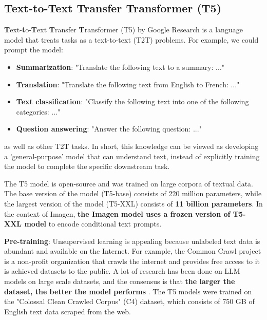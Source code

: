 \subsection{Text-to-Text Transfer Transformer (T5)}
\label{subsec:t5}

\textbf{T}ext-\textbf{t}o-\textbf{T}ext \textbf{T}ransfer \textbf{T}ransformer (T5) \cite{t5_model} by Google Research is a language model that treats tasks as a text-to-text (T2T) problems. For example, we could prompt the model:

\begin{itemize}
    \item \textbf{Summarization}: "Translate the following text to a summary: ..."
    \item \textbf{Translation}: "Translate the following text from English to French: ..."
    \item \textbf{Text classification}: "Classify the following text into one of the following categories: ..."
    \item \textbf{Question answering}: "Answer the following question: ..."
\end{itemize}

as well as other T2T tasks. In short, this knowledge can be viewed as developing a 'general-purpose' model that can understand text, instead of explicitly training the model to complete the specific downstream task.

The T5 model is open-source and was trained on large corpora of textual data. The base version of the model (T5-base) consists of 220 million parameters, while the largest version of the model (T5-XXL) consists of \textbf{11 billion parameters}. In the context of Imagen, \textbf{the Imagen model uses a frozen version of T5-XXL model} to encode conditional text prompts.

\textbf{Pre-training}: Unsupervised learning is appealing because unlabeled text data is abundant and available on the Internet. For example, the Common Crawl project \cite{common_crawl_project} is a non-profit organization that crawls the internet and provides free access to it is achieved datasets to the public. A lot of research has been done on LLM models on large scale datasets, and the consensus is that \textbf{the larger the dataset, the better the model performs} \cite{radford2019language} \cite{jozefowicz2016exploring} \cite{hestness2017deep}. The T5 models were trained on the "Colossal Clean Crawled Corpus" (C4) dataset, which consists of 750 GB of English text data scraped from the web.

